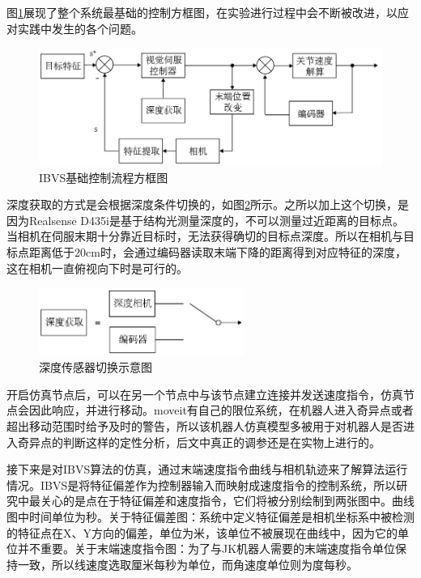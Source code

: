 \documentclass[fontset=fandol,type=bachelor,campus=harbin,bsmainpagenumberline=true]{hithesisbook}
\begin{document}
图\ref{IBVS基础控制流程方框图}展现了整个系统最基础的控制方框图，在实验进行过程中会不断被改进，以应对实践中发生的各个问题。
\begin{figure}[h]
\centering
\includegraphics[width = 1.0\textwidth]{chapter2/IBVS基础控制流程方框图}
\caption{IBVS基础控制流程方框图}
\label{IBVS基础控制流程方框图}
\end{figure}


深度获取的方式是会根据深度条件切换的，如图\ref{深度传感器切换}所示。之所以加上这个切换，是因为Realsense D435i是基于结构光测量深度的，不可以测量过近距离的目标点。当相机在伺服末期十分靠近目标时，无法获得确切的目标点深度。所以在相机与目标点距离低于20cm时，会通过编码器读取末端下降的距离得到对应特征的深度，这在相机一直俯视向下时是可行的。


\begin{figure}[h]
\centering
\includegraphics[width = 0.60\textwidth]{chapter2/深度选择图}
\caption{深度传感器切换示意图}
\label{深度传感器切换}
\end{figure}


开启仿真节点后，可以在另一个节点中与该节点建立连接并发送速度指令，仿真节点会因此响应，并进行移动。moveit有自己的限位系统，在机器人进入奇异点或者超出移动范围时给予及时的警告，所以该机器人仿真模型多被用于对机器人是否进入奇异点的判断这样的定性分析，后文中真正的调参还是在实物上进行的。


接下来是对IBVS算法的仿真，通过末端速度指令曲线与相机轨迹来了解算法运行情况。IBVS是将特征偏差作为控制器输入而映射成速度指令的控制系统，所以研究中最关心的是点在于特征偏差和速度指令，它们将被分别绘制到两张图中。曲线图中时间单位为秒。关于特征偏差图：系统中定义特征偏差是相机坐标系中被检测的特征点在X、Y方向的偏差，单位为米，该单位不被展现在曲线中，因为它的单位并不重要。关于末端速度指令图：为了与JK机器人需要的末端速度指令单位保持一致，所以线速度选取厘米每秒为单位，而角速度单位则为度每秒。
\end{document}
